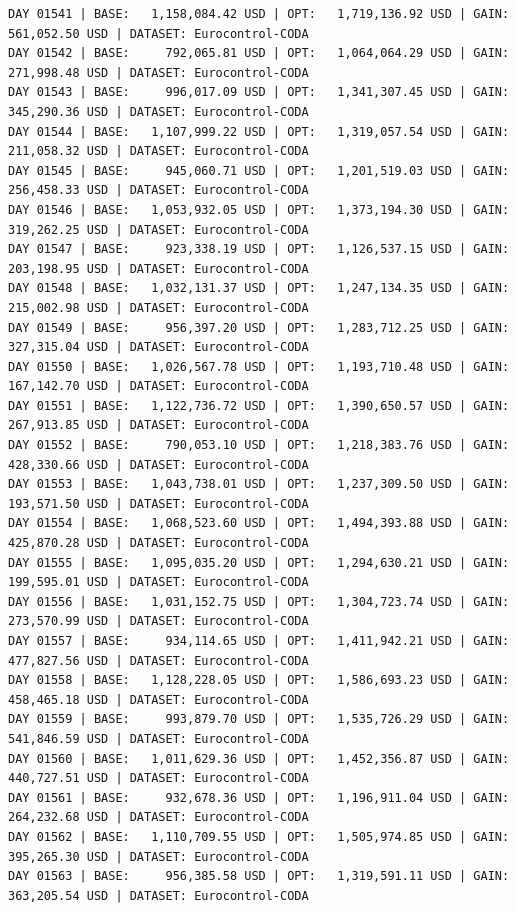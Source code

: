 \documentclass[11pt,a4paper]{article}
\begin{document}
\begin{verbatim}
DAY 01541 | BASE:   1,158,084.42 USD | OPT:   1,719,136.92 USD | GAIN: 561,052.50 USD | DATASET: Eurocontrol-CODA
DAY 01542 | BASE:     792,065.81 USD | OPT:   1,064,064.29 USD | GAIN: 271,998.48 USD | DATASET: Eurocontrol-CODA
DAY 01543 | BASE:     996,017.09 USD | OPT:   1,341,307.45 USD | GAIN: 345,290.36 USD | DATASET: Eurocontrol-CODA
DAY 01544 | BASE:   1,107,999.22 USD | OPT:   1,319,057.54 USD | GAIN: 211,058.32 USD | DATASET: Eurocontrol-CODA
DAY 01545 | BASE:     945,060.71 USD | OPT:   1,201,519.03 USD | GAIN: 256,458.33 USD | DATASET: Eurocontrol-CODA
DAY 01546 | BASE:   1,053,932.05 USD | OPT:   1,373,194.30 USD | GAIN: 319,262.25 USD | DATASET: Eurocontrol-CODA
DAY 01547 | BASE:     923,338.19 USD | OPT:   1,126,537.15 USD | GAIN: 203,198.95 USD | DATASET: Eurocontrol-CODA
DAY 01548 | BASE:   1,032,131.37 USD | OPT:   1,247,134.35 USD | GAIN: 215,002.98 USD | DATASET: Eurocontrol-CODA
DAY 01549 | BASE:     956,397.20 USD | OPT:   1,283,712.25 USD | GAIN: 327,315.04 USD | DATASET: Eurocontrol-CODA
DAY 01550 | BASE:   1,026,567.78 USD | OPT:   1,193,710.48 USD | GAIN: 167,142.70 USD | DATASET: Eurocontrol-CODA
DAY 01551 | BASE:   1,122,736.72 USD | OPT:   1,390,650.57 USD | GAIN: 267,913.85 USD | DATASET: Eurocontrol-CODA
DAY 01552 | BASE:     790,053.10 USD | OPT:   1,218,383.76 USD | GAIN: 428,330.66 USD | DATASET: Eurocontrol-CODA
DAY 01553 | BASE:   1,043,738.01 USD | OPT:   1,237,309.50 USD | GAIN: 193,571.50 USD | DATASET: Eurocontrol-CODA
DAY 01554 | BASE:   1,068,523.60 USD | OPT:   1,494,393.88 USD | GAIN: 425,870.28 USD | DATASET: Eurocontrol-CODA
DAY 01555 | BASE:   1,095,035.20 USD | OPT:   1,294,630.21 USD | GAIN: 199,595.01 USD | DATASET: Eurocontrol-CODA
DAY 01556 | BASE:   1,031,152.75 USD | OPT:   1,304,723.74 USD | GAIN: 273,570.99 USD | DATASET: Eurocontrol-CODA
DAY 01557 | BASE:     934,114.65 USD | OPT:   1,411,942.21 USD | GAIN: 477,827.56 USD | DATASET: Eurocontrol-CODA
DAY 01558 | BASE:   1,128,228.05 USD | OPT:   1,586,693.23 USD | GAIN: 458,465.18 USD | DATASET: Eurocontrol-CODA
DAY 01559 | BASE:     993,879.70 USD | OPT:   1,535,726.29 USD | GAIN: 541,846.59 USD | DATASET: Eurocontrol-CODA
DAY 01560 | BASE:   1,011,629.36 USD | OPT:   1,452,356.87 USD | GAIN: 440,727.51 USD | DATASET: Eurocontrol-CODA
DAY 01561 | BASE:     932,678.36 USD | OPT:   1,196,911.04 USD | GAIN: 264,232.68 USD | DATASET: Eurocontrol-CODA
DAY 01562 | BASE:   1,110,709.55 USD | OPT:   1,505,974.85 USD | GAIN: 395,265.30 USD | DATASET: Eurocontrol-CODA
DAY 01563 | BASE:     956,385.58 USD | OPT:   1,319,591.11 USD | GAIN: 363,205.54 USD | DATASET: Eurocontrol-CODA

\end{verbatim}
\end{document}
